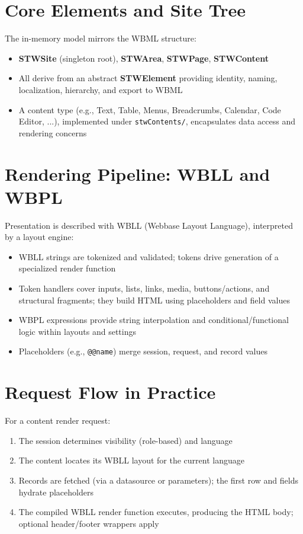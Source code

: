 \section{Core Elements and Site Tree}
The in-memory model mirrors the WBML structure:
\begin{itemize}
  \item \textbf{STWSite} (singleton root), \textbf{STWArea}, \textbf{STWPage}, \textbf{STWContent}
  \item All derive from an abstract \textbf{STWElement} providing identity, naming, localization, hierarchy, and export to WBML
  \item A content type (e.g., Text, Table, Menus, Breadcrumbs, Calendar, Code Editor, ...), implemented under \texttt{stwContents/}, encapsulates data access and rendering concerns
\end{itemize}

\section{Rendering Pipeline: WBLL and WBPL}
Presentation is described with WBLL (Webbase Layout Language), interpreted by a layout engine:
\begin{itemize}
  \item WBLL strings are tokenized and validated; tokens drive generation of a specialized render function
  \item Token handlers cover inputs, lists, links, media, buttons/actions, and structural fragments; they build HTML using placeholders and field values
  \item WBPL expressions provide string interpolation and conditional/functional logic within layouts and settings
  \item Placeholders (e.g., \verb|@@name|) merge session, request, and record values
\end{itemize}

\section{Request Flow in Practice}
For a content render request:
\begin{enumerate}
  \item The session determines visibility (role-based) and language
  \item The content locates its WBLL layout for the current language
  \item Records are fetched (via a datasource or parameters); the first row and fields hydrate placeholders
  \item The compiled WBLL render function executes, producing the HTML body; optional header/footer wrappers apply
\end{enumerate}

